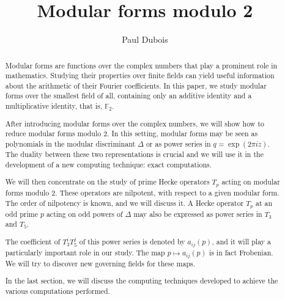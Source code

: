 \documentclass[a4paper, 11pt]{article}
\title{Modular forms modulo 2}
\author{Paul Dubois}
\newcommand{\F}{\mathbb{F}}
\begin{document}
	\maketitle
	\begin{abstract}
		Modular forms are functions over the complex numbers that play a prominent role in mathematics.
		Studying their properties over finite fields can yield useful information about the arithmetic of their Fourier coefficients.
		In this paper, we study modular forms over the smallest field of all, containing only an additive identity and a multiplicative identity, that is, $\F_2$.
		
		After introducing modular forms over the complex numbers, we will show how to reduce modular forms modulo 2.
		In this setting, modular forms may be seen as polynomials in the modular discriminant $\Delta$ or as power series in $q=\exp(2\pi i z)$. The duality between these two representations is crucial and we will use it in the development of a new computing technique: exact computations.
		
		We will then concentrate on the study of prime Hecke operators $T_p$ acting on modular forms modulo 2.
		These operators are nilpotent, with respect to a given modular form. The order of nilpotency is known, and we will discuss it.
		A Hecke operator $T_p$ at an odd prime $p$ acting on odd powers of $\Delta$ may also be expressed as power series in $T_3$ and $T_5$.
		
		The coefficient of $T_3^{i}T_5^{j}$ of this power series is denoted by $a_{ij}(p)$, and it will play a particularly important role in our study.
		The map $p \mapsto a_{ij}(p)$ is in fact Frobenian.
		We will try to discover new governing fields for these maps.
		
		In the last section, we will discuss the computing techniques developed to achieve the various computations performed.
	\end{abstract}
	\tableofcontents
	
	
	
	
	
	
	\appendix
	
	
	
	
	
\end{document}
